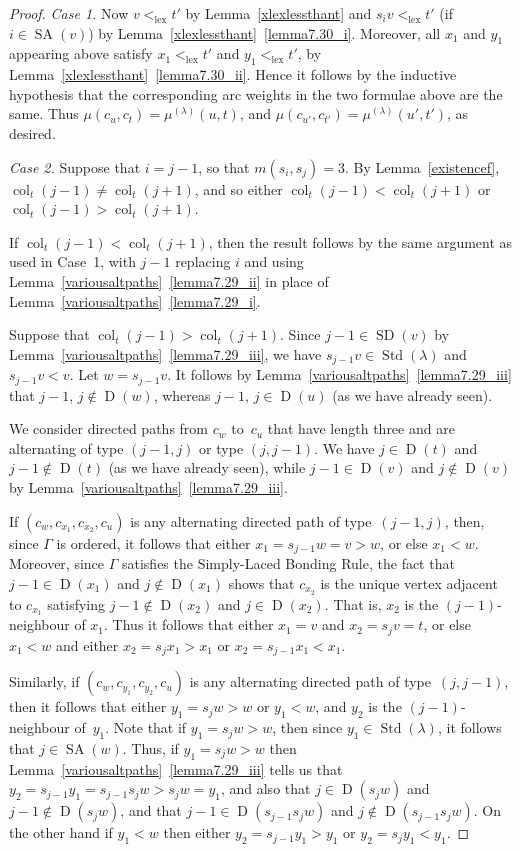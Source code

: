 \documentclass[ALCO,ThmDefs,Unicode,epreuves]{cedram}
\newenvironment{Case}[1]{\smallskip\noindent\emph{Case #1}\endgraf
 \nobreak\noindent\ignorespaces}{\endgraf\smallskip}
\DeclareMathOperator{\lex}{lex}
\DeclareMathOperator{\col}{col}
\DeclareMathOperator{\STD}{Std}
\DeclareMathOperator{\SD}{SD}
\DeclareMathOperator{\SA}{SA}
\DeclareMathOperator{\D}{D}
\begin{document}
\begin{proof}
\begin{Case}{1.}
Now $v<_{\lex}t'$ by Lemma~\ref{xlexlessthant} and $s_iv<_{\lex}t'$ (if $i\in\SA(v)$)
by Lemma~\ref{xlexlessthant}~\ref{lemma7.30_i}. Moreover, all $x_1$ and $y_1$ appearing above
satisfy $x_1<_{\lex}t'$ and $y_1 <_{\lex} t'$, by Lemma~\ref{xlexlessthant}~\ref{lemma7.30_ii}. Hence
it follows by the inductive hypothesis that the corresponding arc weights
in the two formulae above are the same. Thus $\mu(c_{u},c_{t})=\mu^{(\lambda)}(u,t)$,
and $\mu(c_{u'},c_{t'})=\mu^{(\lambda)}(u',t')$, as desired.
\end{Case}

\begin{Case}{2.} Suppose that $i=j-1$, so that $m(s_i,s_j)=3$.
By Lemma~\ref{existencef}, $\col_{t}(j-1)\neq\col_{t}(j+1)$, and so either
$\col_{t}(j-1)<\col_{t}(j+1)$ or $\col_{t}(j-1)>\col_{t}(j+1)$.

If $\col_{t}(j-1)<\col_{t}(j+1)$, then the result follows by the same argument as
used in Case~1, with $j-1$ replacing $i$ and using Lemma~\ref{variousaltpaths}~\ref{lemma7.29_ii}
in place of Lemma~\ref{variousaltpaths}~\ref{lemma7.29_i}.

Suppose that $\col_{t}(j-1)>\col_{t}(j+1)$. Since
$j-1\in\SD(v)$ by Lemma~\ref{variousaltpaths}~\ref{lemma7.29_iii}, we have
$s_{j-1}v\in\STD(\lambda)$ and $s_{j-1}v<v$. Let
$w=s_{j-1}v$. It follows by Lemma~\ref{variousaltpaths}~\ref{lemma7.29_iii} that
$j-1,\,j\notin\D(w)$, whereas
$j-1,\,j\in\D(u)$ (as we have already seen).

We consider directed paths from $c_w$ to~$c_{u}$ that have length three
and are alternating of type $(j-1,j)$ or type $(j,j-1)$.
We have $j\in\D(t)$ and $j-1\notin\D(t)$ (as we have already seen),
while $j-1\in\D(v)$ and $j\notin\D(v)$ by Lemma~\ref{variousaltpaths}~\ref{lemma7.29_iii}.

If $(c_w,c_{x_1},c_{x_2},c_{u})$ is any alternating directed path of
type~$(j-1,j)$, then, since $\Gamma$ is ordered, it follows that
either $x_1=s_{j-1}w=v>w$, or else $x_1<w$. Moreover, since $\Gamma$ satisfies the
Simply-Laced Bonding Rule,
the fact that
$j-1\in\D(x_1)$ and $j\notin\D(x_1)$
shows that $c_{x_{2}}$ is the unique vertex adjacent to $c_{x_{1}}$ satisfying $j-1\notin\D(x_2)$
and $j\in\D(x_2)$. That is, $x_2$ is the $(j-1)$-neighbour of $x_1$. Thus it follows that
either $x_1=v$ and $x_2=s_{j}v=t$, or else $x_1<w$ and
either $x_2=s_jx_1>x_1$ or $x_2=s_{j-1}x_1<x_1$.

Similarly, if $(c_{w},c_{y_1},c_{y_2},c_{u})$ is any alternating directed path
of type~$(j,j-1)$, then it follows that either
$y_1=s_jw>w$ or $y_1<w$, and $y_2$ is the $(j-1)$-neighbour of~$y_1$.
Note that if $y_1=s_jw>w$, then since $y_1\in\STD(\lambda)$,
it follows that $j\in\SA(w)$. Thus, if $y_1=s_jw>w$ then Lemma~\ref{variousaltpaths}~\ref{lemma7.29_iii}
tells us that $y_2=s_{j-1}y_1=s_{j-1}s_jw>s_jw=y_1$, and also that
$j\in\D(s_jw)$ and $j-1\notin\D(s_jw)$, and that
$j-1\in\D(s_{j-1}s_jw)$ and $j\notin\D(s_{j-1}s_jw)$. On the other hand
if $y_1<w$ then either $y_2=s_{j-1}y_1>y_1$ or $y_2=s_jy_1<y_1$.


\end{Case}
\end{proof}
\end{document}
